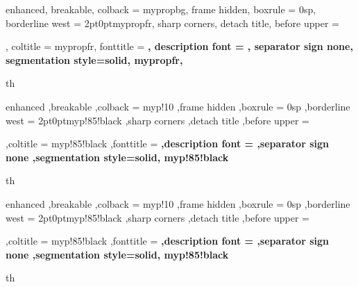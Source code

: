 {%
	enhanced,
	breakable,
	colback = mypropbg,
	frame hidden,
	boxrule = 0sp,
	borderline west = {2pt}{0pt}{mypropfr},
	sharp corners,
	detach title,
	before upper = \tcbtitle\par\smallskip,
	coltitle = mypropfr,
	fonttitle = \bfseries\sffamily,
	description font = \mdseries,
	separator sign none,
	segmentation style={solid, mypropfr},
}
{th}


{%
	enhanced
	,breakable
	,colback = myp!10
	,frame hidden
	,boxrule = 0sp
	,borderline west = {2pt}{0pt}{myp!85!black}
	,sharp corners
	,detach title
	,before upper = \tcbtitle\par\smallskip
	,coltitle = myp!85!black
	,fonttitle = \bfseries\sffamily
	,description font = \mdseries
	,separator sign none
	,segmentation style={solid, myp!85!black}
}
{th}
{%
	enhanced
	,breakable
	,colback = myp!10
	,frame hidden
	,boxrule = 0sp
	,borderline west = {2pt}{0pt}{myp!85!black}
	,sharp corners
	,detach title
	,before upper = \tcbtitle\par\smallskip
	,coltitle = myp!85!black
	,fonttitle = \bfseries\sffamily
	,description font = \mdseries
	,separator sign none
	,segmentation style={solid, myp!85!black}
}
{th}


